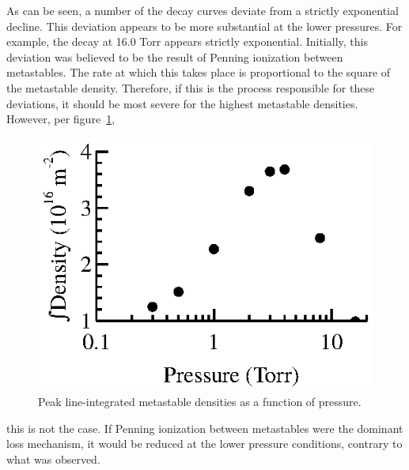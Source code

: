 As can be seen, a number of the decay curves deviate from a strictly exponential
decline. This deviation appears to be more substantial at the lower pressures.
For example, the decay at 16.0 Torr appears strictly exponential. Initially,
this deviation was believed to be the result of Penning ionization between
metastables. The rate at which this takes place is proportional to the square of
the metastable density. Therefore, if this is the process responsible for these
deviations, it should be most severe for the highest metastable densities.
However, per figure~\ref{fig:peaknm},
\begin{figure}
  \centering
  \includegraphics{./chapters/metastables/figures/peaknm.eps}
  \caption{Peak line-integrated metastable densities as a function of pressure.}
  \label{fig:peaknm}
\end{figure}
this is not the case. If Penning ionization between metastables were the
dominant loss mechanism, it would be reduced at the lower pressure conditions,
contrary to what was observed.

